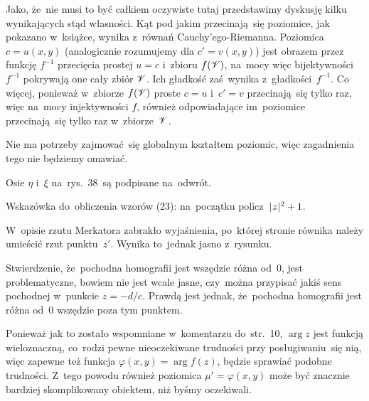 \documentclass[a4paper,11pt]{article}
\numberwithin{equation}{section}
\begin{document}
Jako, że~nie musi to być całkiem oczywiste tutaj przedstawimy
dyskusję kilku wynikających stąd własności. Kąt pod jakim
przecinają~się poziomice, jak pokazano w~książce, wynika z~równań
Cauchy'ego-Riemanna. Poziomica $c = u( x, y )$ (analogicznie
rozumujemy dla $c' = v( x, y )$) jest obrazem przez funkcję
$f^{ -1 }$ przecięcia prostej $u = c$ i~zbioru $f( \mathcal{V} )$, na~mocy
więc bijektywności~$f^{ -1 }$ pokrywają one cały zbiór $\mathcal{V}$. Ich
gładkość zaś~wynika z~gładkości~$f^{ -1 }$. Co więcej, ponieważ
w~zbiorze $f( \mathcal{V} )$ proste $c = u$ i~$c' = v$ przecinają~się
tylko raz, więc na~mocy injektywności $f$, również odpowiadające
im~poziomice przecinają~się tylko raz w~zbiorze~$\mathcal{V}$.

Nie ma potrzeby zajmować~się globalnym kształtem poziomic, więc
zagadnienia tego nie będziemy omawiać.

\VerSpaceFour





\noindent
{} Osie $\eta$ i~$\xi$ na~rys.~38~są podpisane na~odwrót.

\VerSpaceFour





\noindent
{} Wskazówka do~obliczenia wzorów (23): na~początku
policz~$| \hspace{0.05em}  z  \hspace{0.05em} |^{ 2 } + 1$.

\VerSpaceFour





\noindent
{} W~opisie rzutu Merkatora zabrakło wyjaśnienia, po~której stronie
równika należy umieścić rzut punktu~$z'$. Wynika to~jednak jasno z~rysunku.

\VerSpaceFour





\noindent
{} Stwierdzenie, że~pochodna homografii jest wszędzie różna od~0,
jest problematyczne, bowiem nie jest wcale jasne, czy~można przypisać
jakiś sens pochodnej w~punkcie $z = -d / c$. Prawdą jest jednak,
że~pochodna homografii jest różna od~0 wszędzie poza tym punktem.

\VerSpaceFour





\noindent
{} Ponieważ jak to zostało wspomniane w~komentarzu do~str.~10,
$\arg z$ jest funkcją wieloznaczną, co~rodzi pewne nieoczekiwane trudności
przy posługiwaniu~się nią, więc zapewne też funkcja
$\varphi( x, y ) = \arg f( z )$, będzie sprawiać podobne trudności. Z~tego powodu
również poziomica $\mu' = \varphi( x, y )$ może być znacznie bardziej skomplikowany
obiektem, niż byśmy oczekiwali.
\end{document}
